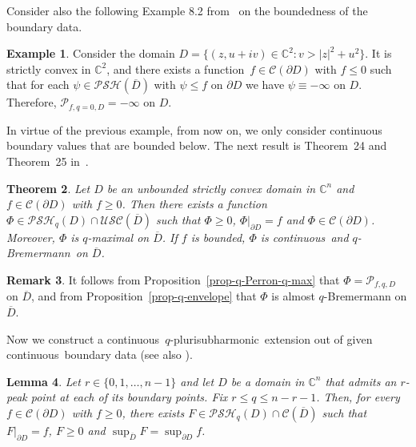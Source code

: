 \documentclass[reqno]{amsart}
\newtheorem{thm}{Theorem}[section]
\newtheorem{lem}[thm]{Lemma}
\theoremstyle{definition}
\newtheorem{ex}[thm]{Example}
\newtheorem{rem}[thm]{Remark}
\numberwithin{equation}{section}
\newcommand{\cbb}{\mathbb{C}}
\newcommand{\ccal}{\mathcal{C}}
\newcommand{\pcal}{\mathcal{P}}
\newcommand{\USC}{\mathcal{USC}}
\newcommand{\qbrem}{$q$-Bremermann}
\newcommand{\qpsh}{$q$-pluri\-sub\-harmonic}
\newcommand{\PSH}{\mathcal{PSH}}
\newcommand{\cont}{continuous}
\newcommand{\fct}{function}
\newcommand{\cld}{\overline{D}}
\begin{document}
Consider also the following Example 8.2 from~\cite{ShTo} on the boundedness of the boundary data.

\begin{ex}\label{ex-Sh-To} Consider the domain $D=\{(z,u+iv) \in \cbb^2 : v > |z|^2 + u^2\}$. It is strictly convex in $\cbb^2$, and there exists a \fct\ $f \in \ccal(\partial D)$ with $f \leq 0$ such that for each $\psi \in \PSH(\cld)$ with $\psi \leq f$ on $\partial D$ we have $\psi\equiv-\infty$ on $D$. Therefore, $\pcal_{f,{q=0},D}=-\infty$ on $D$.
\end{ex}

In virtue of the previous example, from now on, we only consider continuous boundary values that are bounded below. The next result is Theorem~24 and Theorem~25 in~\cite{SiTo}.


\begin{thm}\label{thm-SiTo} Let $D$ be an unbounded strictly convex domain in $\cbb^n$ and $f \in \ccal(\partial D)$ with $f\geq0$. Then there exists a \fct\ $\Phi \in \PSH_q(D) \cap \USC(\cld)$ such that $\Phi \geq0$, $\Phi|_{\partial D}=f$ and $\Phi \in \ccal(\partial D)$. Moreover, $\Phi$ is $q$-maximal on $\cld$. If $f$ is bounded, $\Phi$ is \cont\ and \qbrem\ on $\cld$.
\end{thm}

\begin{rem} It follows from Proposition~\ref{prop-q-Perron-q-max} that $\Phi=\pcal_{f,q,D}$ on $\cld$, and from Proposition~\ref{prop-q-envelope} that $\Phi$ is almost $q$-Bremermann on $\cld$.
\end{rem}



Now we construct a \cont\ \qpsh\ extension out of given \cont\ boundary data (see also \cite{HST}).

\begin{lem}\label{lem-qpsh-extension} Let $r \in \{0,1,\ldots,n-1\}$ and let $D$ be a domain in $\cbb^n$ that admits an $r$-peak point at each of its boundary points. Fix $r \leq q \leq n-r-1$. Then, for every $f\in\ccal(\partial D)$ with $f \geq 0$, there exists $F \in \PSH_q(D) \cap \ccal(\cld)$ such that $F|_{\partial D}=f$, $F\geq0$ and $\sup_{\cld} F = \sup_{\partial D} f$.
\end{lem}
\end{document}
